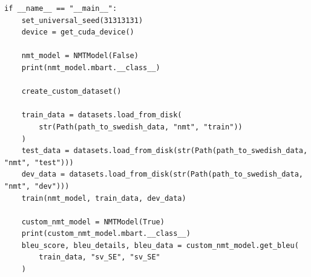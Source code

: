 \documentclass{article}
\begin{document}
\begin{lstlisting}
if __name__ == "__main__":
    set_universal_seed(31313131)
    device = get_cuda_device()

    nmt_model = NMTModel(False)
    print(nmt_model.mbart.__class__)

    create_custom_dataset()

    train_data = datasets.load_from_disk(
        str(Path(path_to_swedish_data, "nmt", "train"))
    )
    test_data = datasets.load_from_disk(str(Path(path_to_swedish_data, "nmt", "test")))
    dev_data = datasets.load_from_disk(str(Path(path_to_swedish_data, "nmt", "dev")))
    train(nmt_model, train_data, dev_data)

    custom_nmt_model = NMTModel(True)
    print(custom_nmt_model.mbart.__class__)
    bleu_score, bleu_details, bleu_data = custom_nmt_model.get_bleu(
        train_data, "sv_SE", "sv_SE"
    )
\end{lstlisting}
\end{document}

